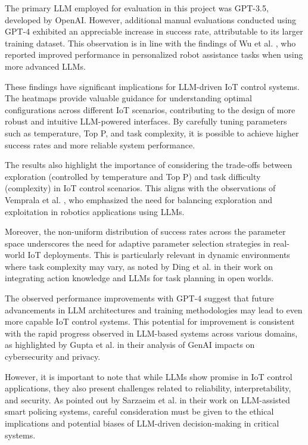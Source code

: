 \documentclass{ieeeaccess}
\begin{document}
The primary LLM employed for evaluation in this project was GPT-3.5, developed by OpenAI. However, additional manual evaluations conducted using GPT-4 exhibited an appreciable increase in success rate, attributable to its larger training dataset. This observation is in line with the findings of Wu et al. \cite{Wu2023}, who reported improved performance in personalized robot assistance tasks when using more advanced LLMs.

These findings have significant implications for LLM-driven IoT control systems. The heatmaps provide valuable guidance for understanding optimal configurations across different IoT scenarios, contributing to the design of more robust and intuitive LLM-powered interfaces. By carefully tuning parameters such as temperature, Top P, and task complexity, it is possible to achieve higher success rates and more reliable system performance.

The results also highlight the importance of considering the trade-offs between exploration (controlled by temperature and Top P) and task difficulty (complexity) in IoT control scenarios. This aligns with the observations of Vemprala et al. \cite{10500490}, who emphasized the need for balancing exploration and exploitation in robotics applications using LLMs.

Moreover, the non-uniform distribution of success rates across the parameter space underscores the need for adaptive parameter selection strategies in real-world IoT deployments. This is particularly relevant in dynamic environments where task complexity may vary, as noted by Ding et al. \cite{Ding2023} in their work on integrating action knowledge and LLMs for task planning in open worlds.

The observed performance improvements with GPT-4 suggest that future advancements in LLM architectures and training methodologies may lead to even more capable IoT control systems. This potential for improvement is consistent with the rapid progress observed in LLM-based systems across various domains, as highlighted by Gupta et al. \cite{10198233} in their analysis of GenAI impacts on cybersecurity and privacy.

However, it is important to note that while LLMs show promise in IoT control applications, they also present challenges related to reliability, interpretability, and security. As pointed out by Sarzaeim et al. \cite{10538107} in their work on LLM-assisted smart policing systems, careful consideration must be given to the ethical implications and potential biases of LLM-driven decision-making in critical systems.
\end{document}
